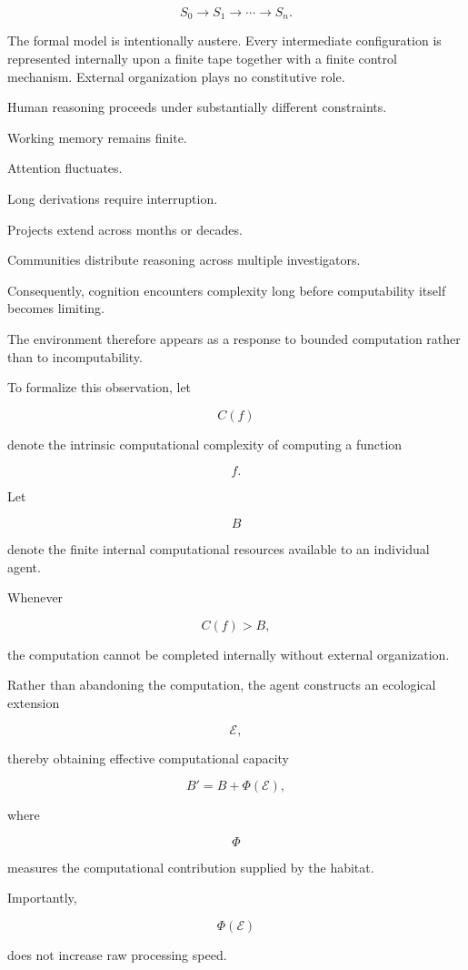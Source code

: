 \documentclass[12pt,oneside]{article}
\theoremstyle{remark}
\begin{document}
\[
S_0
\rightarrow
S_1
\rightarrow
\cdots
\rightarrow
S_n.
\]

The formal model is intentionally austere. Every intermediate configuration is
represented internally upon a finite tape together with a finite control
mechanism. External organization plays no constitutive role.

Human reasoning proceeds under substantially different constraints.

Working memory remains finite.

Attention fluctuates.

Long derivations require interruption.

Projects extend across months or decades.

Communities distribute reasoning across multiple investigators.

Consequently, cognition encounters complexity long before computability itself
becomes limiting.

The environment therefore appears as a response to bounded computation rather
than to incomputability.

To formalize this observation, let

\[
C(f)
\]

denote the intrinsic computational complexity of computing a function

\[
f.
\]

Let

\[
B
\]

denote the finite internal computational resources available to an individual
agent.

Whenever

\[
C(f)
>
B,
\]

the computation cannot be completed internally without external organization.

Rather than abandoning the computation, the agent constructs an ecological
extension

\[
\mathcal E,
\]

thereby obtaining effective computational capacity

\[
B'
=
B
+
\Phi(\mathcal E),
\]

where

\[
\Phi
\]

measures the computational contribution supplied by the habitat.

Importantly,

\[
\Phi(\mathcal E)
\]

does not increase raw processing speed.
\end{document}
